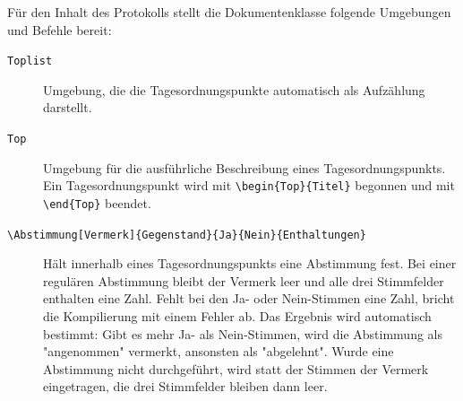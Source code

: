 Für den Inhalt des Protokolls stellt die Dokumentenklasse folgende Umgebungen und Befehle bereit:
\begin{description}
	\item[\texttt{Toplist}] Umgebung, die die Tagesordnungspunkte automatisch als Aufzählung darstellt.
	\item[\texttt{Top}] Umgebung für die ausführliche Beschreibung eines Tagesordnungspunkts. Ein Tagesordnungspunkt wird mit \texttt{\textbackslash begin\{Top\}\{Titel\}} begonnen und mit \texttt{\textbackslash end\{Top\}} beendet.
	\item[{\texttt{\textbackslash Abstimmung[Vermerk]\{Gegenstand\}\{Ja\}\{Nein\}\{Enthaltungen\}}}] Hält innerhalb eines Tagesordnungspunkts eine Abstimmung fest. Bei einer regulären Abstimmung bleibt der Vermerk leer und alle drei Stimmfelder enthalten eine Zahl. Fehlt bei den Ja- oder Nein-Stimmen eine Zahl, bricht die Kompilierung mit einem Fehler ab. Das Ergebnis wird automatisch bestimmt: Gibt es mehr Ja- als Nein-Stimmen, wird die Abstimmung als "angenommen" vermerkt, ansonsten als "abgelehnt". Wurde eine Abstimmung nicht durchgeführt, wird statt der Stimmen der Vermerk eingetragen, die drei Stimmfelder bleiben dann leer.
\end{description}
